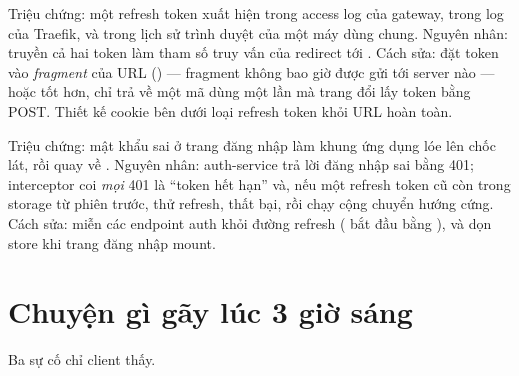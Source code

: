\begin{pitfall}
Triệu chứng: một refresh token xuất hiện trong access log của gateway,
trong log của Traefik, và trong lịch sử trình duyệt của một máy dùng
chung. Nguyên nhân:  truyền cả hai
token làm tham số truy vấn của redirect tới .
Cách sửa: đặt token vào \emph{fragment} của URL
() --- fragment không bao giờ được gửi tới
server nào --- hoặc tốt hơn, chỉ trả về một mã dùng một lần mà trang
đổi lấy token bằng POST. Thiết kế cookie bên dưới loại refresh token
khỏi URL hoàn toàn.
\end{pitfall}

\begin{pitfall}
Triệu chứng: mật khẩu sai ở trang đăng nhập làm khung ứng dụng lóe lên
chốc lát, rồi quay về . Nguyên nhân: auth-service trả lời
đăng nhập sai bằng 401; interceptor coi \emph{mọi} 401 là ``token hết
hạn'' và, nếu một refresh token cũ còn trong storage từ phiên trước,
thử refresh, thất bại, rồi chạy  cộng chuyển hướng
cứng. Cách sửa: miễn các endpoint auth khỏi đường refresh
( bắt đầu bằng ), và dọn store
khi trang đăng nhập mount.
\end{pitfall}

\section{Chuyện gì gãy lúc 3 giờ sáng}

Ba sự cố chỉ client thấy.

